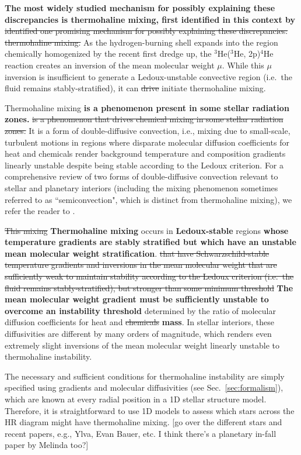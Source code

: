 \textbf{The most widely studied mechanism for possibly explaining these discrepancies is thermohaline mixing, first identified in this context by \citet{charbonnel_thermohaline_2007} }
\sout{identified one promising mechanism for possibly explaining these discrepancies: thermohaline mixing. }
As the hydrogen-burning shell expands into the region chemically homogenized by the recent first dredge up, the $^3$He($^3$He, 2p)$^4$He reaction creates an inversion of the mean molecular weight $\mu$. While this $\mu$ inversion is insufficient to generate a Ledoux-unstable convective region (i.e.~the fluid remains stably-stratified), it can \sout{drive} initiate thermohaline mixing. 

Thermohaline mixing \textbf{is a phenomenon present in some stellar radiation zones.} \sout{is a phenomenon that drives chemical mixing in some stellar radiation zones.} It is a form of double-diffusive convection, i.e., mixing due to small-scale, turbulent motions in regions where disparate molecular diffusion coefficients for heat and chemicals render background temperature and composition gradients linearly unstable despite being stable according to the Ledoux criterion. For a comprehensive review of two forms of double-diffusive convection relevant to stellar and planetary interiors (including the mixing phenomenon sometimes referred to as ``semiconvection", which is distinct from thermohaline mixing), we refer the reader to \citet{garaud_DDC_review_2018}. 

\sout{This mixing} \textbf{Thermohaline mixing} occurs in \textbf{Ledoux-stable} regions \textbf{whose temperature gradients are stably stratified but which have an unstable mean molecular weight stratification}. \sout{that have Schwarzschild-stable temperature gradients and inversions in the mean molecular weight that are sufficiently weak to maintain stability according to the Ledoux criterion (i.e.~the fluid remains stably-stratified), but stronger than some minimum threshold} \textbf{The mean molecular weight gradient must be sufficiently unstable to overcome an instability threshold} determined by the ratio of molecular diffusion coefficients for heat and \sout{chemicals} \textbf{mass}.
In stellar interiors, these diffusivities are different by many orders of magnitude, which renders even extremely slight inversions of the mean molecular weight linearly unstable to thermohaline instability.

The necessary and sufficient conditions for thermohaline instability are simply specified using gradients and molecular diffusivities (see Sec.~\ref{sec:formalism}), which are known at every radial position in a 1D stellar structure model. 
Therefore, it is straightforward to use 1D models to assess which stars across the HR diagram might have thermohaline mixing. [go over the different stars and recent papers, e.g., Ylva, Evan Bauer, etc. I think there's a planetary in-fall paper by Melinda too?]


